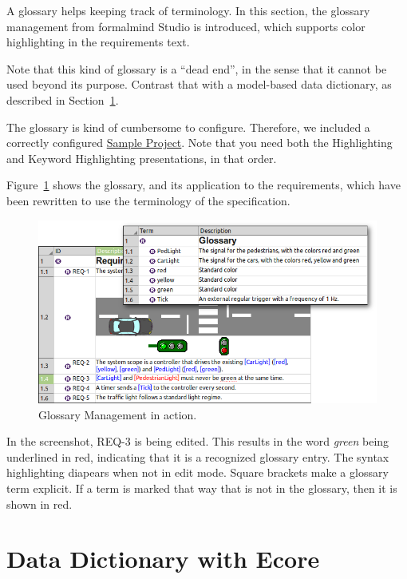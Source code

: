 A glossary helps keeping track of terminology.  In this section, the glossary management from formalmind Studio is introduced, which supports color highlighting in the requirements text.

Note that this kind of glossary is a ``dead end'', in the sense that it cannot be used beyond its purpose.  Contrast that with a model-based data dictionary, as described in Section~\ref{sec:tutorial-ecore}.

The glossary is kind of cumbersome to configure.   Therefore, we included a correctly configured \href{../se-materials/tutorial/tdse-2}{Sample Project}.  Note that you need both the Highlighting and Keyword Highlighting presentations, in that order.

Figure~\ref{fig:tutorial-step02} shows the glossary, and its application to the requirements, which have been rewritten to use the terminology of the specification.

\begin{figure}[h!]
  \centering
  \includegraphics[width=\linewidth]{../se-images/tutorial-step02.png}
  \caption{Glossary Management in action.}
  \label{fig:tutorial-step02}
\end{figure}

In the screenshot, REQ-3 is being edited.  This results in the word \textit{green} being underlined in red, indicating that it is a recognized glossary entry.  The syntax highlighting diapears when not in edit mode.  Square brackets make a glossary term explicit.  If a term is marked that way that is not in the glossary, then it is shown in red.

\section{Data Dictionary with Ecore}
\label{sec:tutorial-ecore}

